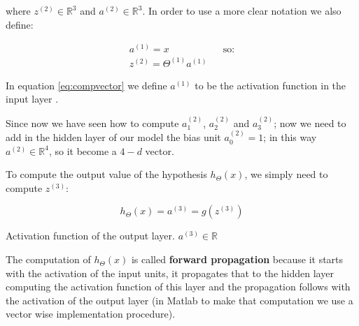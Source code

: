 where $z^{(2)} \in \mathbb{R}^3$ and $a^{(2)} \in \mathbb{R}^3$. In order to use a more clear notation we also define:

\begin{equation}\label{eq:compvector}
\begin{aligned}
a^{(1)}  = x && \text{so:}\\
z^{(2)} = \Theta^{(1)}a^{(1)} 
\end{aligned}
\end{equation}

In equation \ref{eq:compvector} we define $a^{(1)}$ to be the activation function in the input layer .

Since now we have seen how to compute $a_1^{(2)}$, $a_2^{(2)}$ and $a_3^{(2)}$; now we need to add in the hidden layer of our model the bias unit $a_0^{(2)} =1$; in this way $a^{(2)} \in \mathbb{R}^4$, so it become a $4-d$ vector. 

To compute the output value of the hypothesis $h_{\Theta}(x)$, we simply need to compute $z^{(3)}$:

\begin{eqfloat}[H]
\begin{equation}
	h_{\Theta}(x) = a^{(3)}  = g(z^{(3)})
\end{equation}
      \addtocounter{equation}{-1}
        \caption{  Activation function of the output layer. $a^{(3)} \in \mathbb{R}$}
        \label{eq:hypout}
    \end{eqfloat}


The computation of  $h_{\Theta}(x)$ is called {\bf forward propagation} because it starts with the activation of the input units, it propagates that to the hidden layer computing the activation function of this layer and the propagation follows with the activation of the output layer (in Matlab to make that computation we use a vector wise implementation procedure).\\


